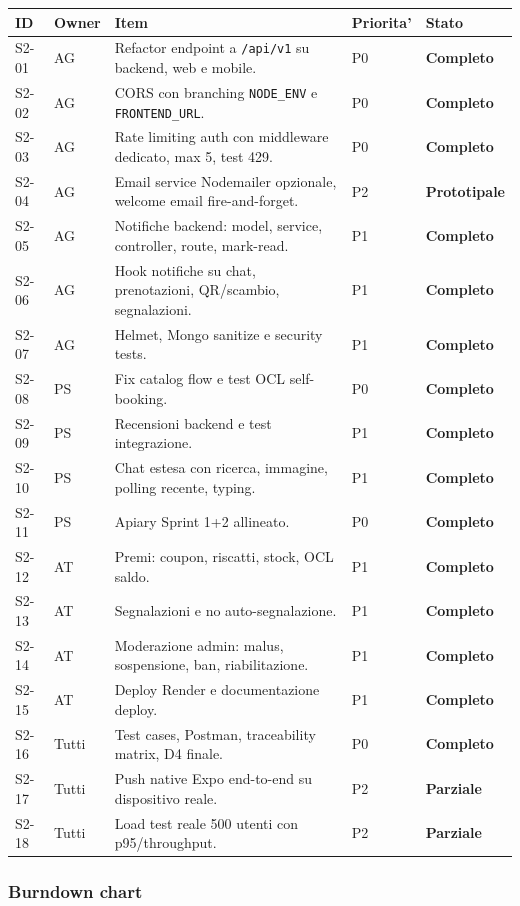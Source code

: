 \documentclass[11pt,a4paper]{article}
\newcommand{\ok}{\textcolor{revalueGreen}{\textbf{Completo}}}
\newcommand{\partiale}{\textcolor{revalueOrange}{\textbf{Parziale}}}
\newcommand{\proto}{\textcolor{revalueOrange}{\textbf{Prototipale}}}
\newcommand{\code}[1]{\texttt{#1}}
\begin{document}
\begin{longtable}{L{1.2cm} L{3.2cm} L{6.6cm} L{2cm} L{2cm}}
\toprule
\textbf{ID} & \textbf{Owner} & \textbf{Item} & \textbf{Priorita'} & \textbf{Stato} \\
\midrule
S2-01 & AG & Refactor endpoint a \code{/api/v1} su backend, web e mobile. & P0 & \ok \\
S2-02 & AG & CORS con branching \code{NODE\_ENV} e \code{FRONTEND\_URL}. & P0 & \ok \\
S2-03 & AG & Rate limiting auth con middleware dedicato, max 5, test 429. & P0 & \ok \\
S2-04 & AG & Email service Nodemailer opzionale, welcome email fire-and-forget. & P2 & \proto \\
S2-05 & AG & Notifiche backend: model, service, controller, route, mark-read. & P1 & \ok \\
S2-06 & AG & Hook notifiche su chat, prenotazioni, QR/scambio, segnalazioni. & P1 & \ok \\
S2-07 & AG & Helmet, Mongo sanitize e security tests. & P1 & \ok \\
S2-08 & PS & Fix catalog flow e test OCL self-booking. & P0 & \ok \\
S2-09 & PS & Recensioni backend e test integrazione. & P1 & \ok \\
S2-10 & PS & Chat estesa con ricerca, immagine, polling recente, typing. & P1 & \ok \\
S2-11 & PS & Apiary Sprint 1+2 allineato. & P0 & \ok \\
S2-12 & AT & Premi: coupon, riscatti, stock, OCL saldo. & P1 & \ok \\
S2-13 & AT & Segnalazioni e no auto-segnalazione. & P1 & \ok \\
S2-14 & AT & Moderazione admin: malus, sospensione, ban, riabilitazione. & P1 & \ok \\
S2-15 & AT & Deploy Render e documentazione deploy. & P1 & \ok \\
S2-16 & Tutti & Test cases, Postman, traceability matrix, D4 finale. & P0 & \ok \\
S2-17 & Tutti & Push native Expo end-to-end su dispositivo reale. & P2 & \partiale \\
S2-18 & Tutti & Load test reale 500 utenti con p95/throughput. & P2 & \partiale \\
\bottomrule
\end{longtable}

\subsubsection{Burndown chart}
\end{document}
